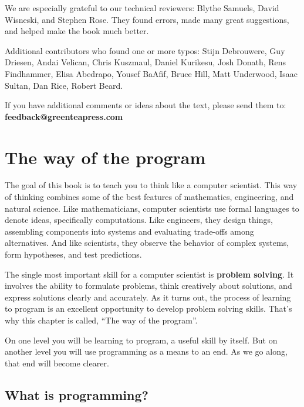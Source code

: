 \documentclass[12pt]{book}
\theoremstyle{exercise}
\begin{document}
We are especially grateful to our technical reviewers: Blythe Samuels, David Wisneski, and Stephen Rose.
They found errors, made many great suggestions, and helped make the book much better.

Additional contributors who found one or more typos: Stijn Debrouwere, Guy Driesen, Andai Velican, Chris Kuszmaul, Daniel Kurikesu, Josh Donath, Rens Findhammer, Elisa Abedrapo, Yousef BaAfif, Bruce Hill, Matt Underwood, Isaac Sultan, Dan Rice, Robert Beard.

If you have additional comments or ideas about the text, please send them to: {\bf feedback@greenteapress.com}


\mainmatter


\chapter{The way of the program}
\label{theway}

The goal of this book is to teach you to think like a computer scientist.
This way of thinking combines some of the best features of mathematics, engineering, and natural science.
Like mathematicians, computer scientists use formal languages to denote ideas, specifically computations.
Like engineers, they design things, assembling components into systems and evaluating trade-offs among alternatives.
And like scientists, they observe the behavior of complex systems, form hypotheses, and test predictions.


The single most important skill for a computer scientist is {\bf problem solving}.
It involves the ability to formulate problems, think creatively about solutions, and express solutions clearly and accurately.
As it turns out, the process of learning to program is an excellent opportunity to develop problem solving skills.
That's why this chapter is called, ``The way of the program''.

On one level you will be learning to program, a useful skill by itself.
But on another level you will use programming as a means to an end.
As we go along, that end will become clearer.


\section{What is programming?}

\end{document}
